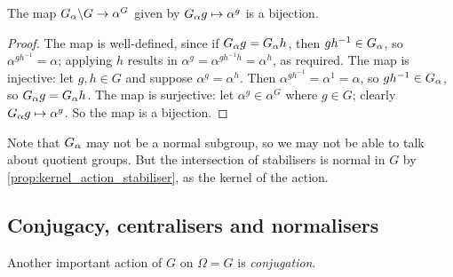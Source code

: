 \begin{theorem}\label{thm:orbit_stabiliser}
    The map $\added{2}{G_\alpha} \backslash G \to \alpha^G$ given by $\added{2}{G_\alpha}g \mapsto \alpha^g$ is a bijection. 
\end{theorem}

\begin{proof}
    The map is well-defined, since if $\added{2}{G_\alpha}g = \added{2}{G_\alpha}h$, then $gh^{-1} \in \added{2}{G_\alpha}$, so $\alpha^{gh^{-1}} = \alpha$; applying $h$ results in $\alpha^g = \alpha^{gh^{-1}h} = \alpha^h$, as required. The map is injective: let $g,h \in G$ and suppose $\alpha^g = \alpha^h$. Then $\alpha^{gh^{-1}} = \alpha^1 = \alpha$, so $gh^{-1} \in \added{2}{G_\alpha}$, so $\added{2}{G_\alpha}g = \added{2}{G_\alpha}h$. The map is surjective: let $\alpha^g \in \alpha^G$ where $g \in G$; clearly $\added{2}{G_\alpha}g \mapsto \alpha^g$. So the map is a bijection.
\end{proof}

Note that $\added{2}{G_\alpha}$ may not be a normal subgroup, so we may not be able to talk about quotient groups. But the intersection of stabilisers is normal in $G$ by \autoref{prop:kernel_action_stabiliser}, as the kernel of the action.

\subsection{Conjugacy, centralisers and normalisers}

Another important action of $G$ on $\Omega = G$ is \textit{conjugation}. 

